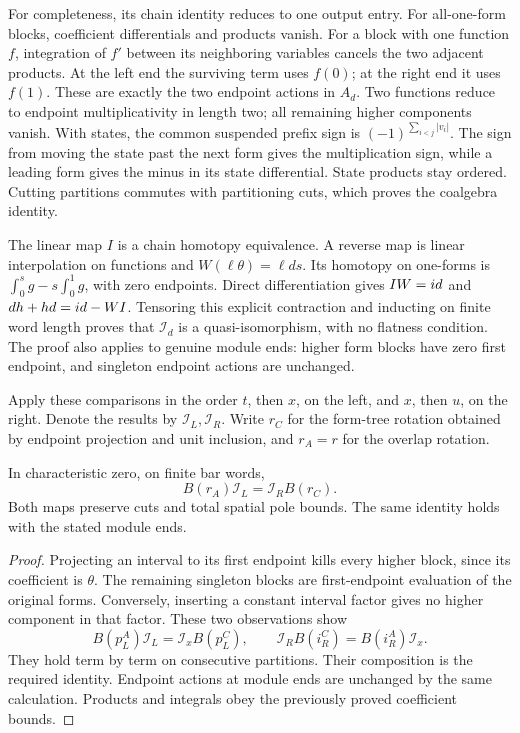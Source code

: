 For completeness, its chain identity reduces to one output entry.
For all-one-form blocks, coefficient differentials and products vanish.
For a block with one function \(f\), integration of \(f'\)
between its neighboring variables cancels the two adjacent products.
At the left end the surviving term uses \(f(0)\); at the
right end it uses \(f(1)\).  These are exactly the two endpoint
actions in \(A_d\).  Two functions reduce to endpoint
multiplicativity in length two; all remaining higher components
vanish.  With states, the common suspended prefix sign is
\((-1)^{\sum_{i<j}|v_i|}\).  The sign from moving the state
past the next form gives the multiplication sign, while a leading
form gives the minus in its state differential.  State products
stay ordered.  Cutting partitions commutes with partitioning cuts,
which proves the coalgebra identity.

The linear map \(I\) is a chain homotopy equivalence.  A
reverse map is linear interpolation on functions and
\(W(\ell\theta)=\ell ds\).  Its homotopy on one-forms is
\(\int_0^s g-s\int_0^1g\), with zero endpoints.
Direct differentiation gives \(IW=id\) and
\(dh+hd=id-WI\).  Tensoring this explicit contraction
and inducting on finite word length proves that \(\mathcal I_d\)
is a quasi-isomorphism, with no flatness condition.  The proof also
applies to genuine module ends: higher form blocks have zero first
endpoint, and singleton endpoint actions are unchanged.

Apply these comparisons in the order \(t\), then \(x\),
on the left, and \(x\), then \(u\), on the right.  Denote
the results by \(\mathcal I_L,\mathcal I_R\).
Write \(r_C\) for the form-tree rotation obtained by endpoint
projection and unit inclusion, and \(r_A=r\) for the overlap
rotation.

\begin{proposition}
\label{tr:prop:form-square}
In characteristic zero, on finite bar words,
\[
 B(r_A)\mathcal I_L=\mathcal I_R B(r_C).
\]
Both maps preserve cuts and total spatial pole bounds.  The same
identity holds with the stated module ends.
\end{proposition}

\begin{proof}
Projecting an interval to its first endpoint kills every higher
block, since its coefficient is \(\theta\).  The remaining
singleton blocks are first-endpoint evaluation of the original
forms.  Conversely, inserting a constant interval factor gives no
higher component in that factor.  These two observations show
\[
 B(p_L^A)\mathcal I_L=\mathcal I_x B(p_L^C),\qquad
 \mathcal I_R B(i_R^C)=B(i_R^A)\mathcal I_x.
\]
They hold term by term on consecutive partitions.  Their composition
is the required identity.  Endpoint actions at module ends are
unchanged by the same calculation.  Products and integrals obey the
previously proved coefficient bounds.
\end{proof}

